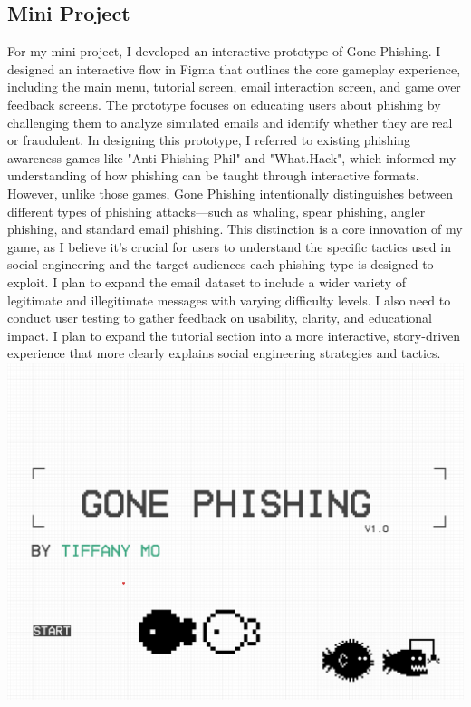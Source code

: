 \documentclass[10pt,twocolumn]{article}
\begin{document}
\subsection{Mini Project}
For my mini project, I developed an interactive prototype of Gone Phishing. I designed an interactive flow in Figma that outlines the core gameplay experience, including the main menu, tutorial screen, email interaction screen, and game over feedback screens. The prototype focuses on educating users about phishing by challenging them to analyze simulated emails and identify whether they are real or fraudulent.
In designing this prototype, I referred to existing phishing awareness games like "Anti-Phishing Phil"\cite{anti-phishing_phil} and "What.Hack"\cite{whathack_2019}, which informed my understanding of how phishing can be taught through interactive formats. However, unlike those games, Gone Phishing intentionally distinguishes between different types of phishing attacks—such as whaling, spear phishing, angler phishing, and standard email phishing. This distinction is a core innovation of my game, as I believe it’s crucial for users to understand the specific tactics used in social engineering and the target audiences each phishing type is designed to exploit. I plan to expand the email dataset to include a wider variety of legitimate and illegitimate messages with varying difficulty levels. I also need to conduct user testing to gather feedback on usability, clarity, and educational impact. I plan to expand the tutorial section into a more interactive, story-driven experience that more clearly explains social engineering strategies and tactics. 
\\
\includegraphics[scale=0.1]{PrototypeTitle.png}
\end{document}
